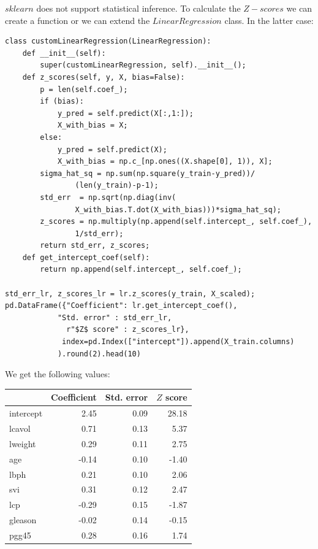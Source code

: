 \documentclass[12pt, letterpaper]{article}
\theoremstyle{definition}
\begin{document}
$sklearn$ does not support statistical inference. To calculate the $Z-scores$ we can create a function or we can extend the $LinearRegression$ class. In the latter case:
\begin{lstlisting}
class customLinearRegression(LinearRegression):
    def __init__(self):
        super(customLinearRegression, self).__init__();
    def z_scores(self, y, X, bias=False):
        p = len(self.coef_);
        if (bias):
            y_pred = self.predict(X[:,1:]);
            X_with_bias = X;
        else:
            y_pred = self.predict(X);
            X_with_bias = np.c_[np.ones((X.shape[0], 1)), X];
        sigma_hat_sq = np.sum(np.square(y_train-y_pred))/
        		(len(y_train)-p-1);
        std_err  = np.sqrt(np.diag(inv(
        		X_with_bias.T.dot(X_with_bias)))*sigma_hat_sq);
        z_scores = np.multiply(np.append(self.intercept_, self.coef_),
        		1/std_err);
        return std_err, z_scores;
    def get_intercept_coef(self):
        return np.append(self.intercept_, self.coef_);
        
std_err_lr, z_scores_lr = lr.z_scores(y_train, X_scaled);
pd.DataFrame({"Coefficient": lr.get_intercept_coef(), 
			"Std. error" : std_err_lr,
              r"$Z$ score" : z_scores_lr},
             index=pd.Index(["intercept"]).append(X_train.columns)
            ).round(2).head(10)
\end{lstlisting}
We get the following values:

\begin{table}
\centering
\begin{tabular}{lrrr}
\toprule
{} &  Coefficient &  Std. error &  $Z$ score \\
\midrule
intercept &         2.45 &        0.09 &      28.18 \\
lcavol    &         0.71 &        0.13 &       5.37 \\
lweight   &         0.29 &        0.11 &       2.75 \\
age       &        -0.14 &        0.10 &      -1.40 \\
lbph      &         0.21 &        0.10 &       2.06 \\
svi       &         0.31 &        0.12 &       2.47 \\
lcp       &        -0.29 &        0.15 &      -1.87 \\
gleason   &        -0.02 &        0.14 &      -0.15 \\
pgg45     &         0.28 &        0.16 &       1.74 \\
\bottomrule
\end{tabular}
\end{table}
\end{document}

